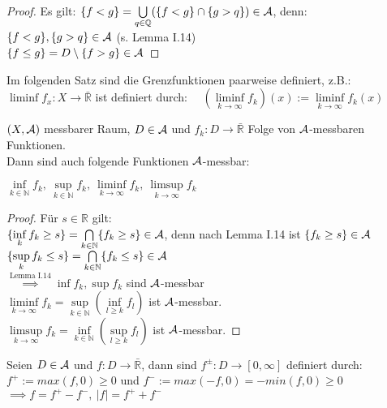   \begin{proof}
    Es gilt: $\{f < g\} = \bigcup\limits_{q \in \mathbb{Q}} (\{f < g\} \cap \{g > q\}) \in \mathcal{A}$, denn:\\
    $\{f < g\}, \{g > q\} \in \mathcal{A}$ (s. Lemma I.14)\\
    $\{f \leq g\} = D \setminus \{f > g\} \in \mathcal{A}$
  \end{proof}

  \begin{remark}
    Im folgenden Satz sind die Grenzfunktionen paarweise definiert, z.B.:\\
    $\liminf f_x : X \to \bar{\mathbb{R}}$ ist definiert durch: \ \ $(\liminf\limits_{k \to \infty} f_k)(x) := \liminf\limits_{k \to \infty} f_k (x)$
  \end{remark}

  \begin{theorem}
    $(X, \mathcal{A})$ messbarer Raum, $D \in \mathcal{A}$ und $f_k:D \to \bar{\mathbb{R}}$ Folge von $\mathcal{A}$-messbaren Funktionen.\\
    Dann sind auch folgende Funktionen $\mathcal{A}$-messbar:
    \begin{center}
      $\inf\limits_{k \in \mathbb{N}} f_k, \ \sup\limits_{k \in \mathbb{N}} f_k, \ \liminf\limits_{k \to \infty} f_k, \ \limsup\limits_{k \to \infty} f_k$
    \end{center}
  \end{theorem}

  \begin{proof}
    Für $s \in \mathbb{R}$ gilt:\\
    $\{\inf\limits_k f_k \geq s\} = \bigcap\limits_{k \in \mathbb{N}} \{f_k \geq s\} \in \mathcal{A}$, denn nach Lemma I.14 ist $\{f_k \geq s\} \in \mathcal{A}$\\
    $\{\sup\limits_k f_k \leq s\} = \bigcap\limits_{k \in \mathbb{N}} \{f_k \leq s\} \in \mathcal{A}$\\
    $\stackrel{\text{Lemma I.14}}{\implies} \inf f_k, \sup f_k$ sind $\mathcal{A}$-messbar\\
    $\liminf\limits_{k \to \infty} f_k = \sup\limits_{k \in \mathbb{N}} (\inf\limits_{l \geq k} f_l)$ ist $\mathcal{A}$-messbar.\\
    $\limsup\limits_{k \to \infty} f_k = \inf\limits_{k \in \mathbb{N}} (\sup\limits_{l \geq k} f_l)$ ist $\mathcal{A}$-messbar.
  \end{proof}

  \begin{notation}
    Seien $D \in \mathcal{A}$ und $f: D \to \bar{\mathbb{R}}$, dann sind $f^{\pm}:D \to [0, \infty]$ definiert durch:\\
    $f^+ := max(f, 0) \geq 0$ und $f^- := max(-f, 0) = -min(f, 0) \geq 0$\\
    $\implies f = f^+ - f^-, \ |f| = f^+ + f^-$
  \end{notation}

